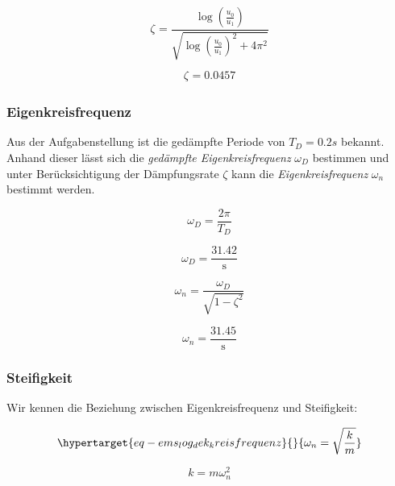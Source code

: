 \documentclass[
  letterpaper,
  DIV=11]{scrreprt}
\begin{document}
\begin{equation}\zeta_{} = \frac{\log{\left(\frac{u_{0}}{u_{1}} \right)}}{\sqrt{\log{\left(\frac{u_{0}}{u_{1}} \right)}^{2} + 4 \pi^{2}}}\end{equation}

\begin{equation}\zeta_{} = 0.0457\end{equation}

\hypertarget{eigenkreisfrequenz}{%
\subsubsection{Eigenkreisfrequenz}\label{eigenkreisfrequenz}}

Aus der Aufgabenstellung ist die gedämpfte Periode von \(T_D = 0.2 s\)
bekannt. Anhand dieser lässt sich die \emph{gedämpfte
Eigenkreisfrequenz} \(\omega_D\) bestimmen und unter Berücksichtigung
der Dämpfungsrate \(\zeta\) kann die \emph{Eigenkreisfrequenz}
\(\omega_n\) bestimmt werden.

\begin{equation}\omega_{D} = \frac{2 \pi}{T_{D}}\end{equation}

\begin{equation}\omega_{D} = \frac{31.42}{\text{s}}\end{equation}

\begin{equation}\omega_{n} = \frac{\omega_{D}}{\sqrt{1 - \zeta_{}^{2}}}\end{equation}

\begin{equation}\omega_{n} = \frac{31.45}{\text{s}}\end{equation}

\hypertarget{steifigkeit}{%
\subsubsection{Steifigkeit}\label{steifigkeit}}

Wir kennen die Beziehung zwischen Eigenkreisfrequenz und Steifigkeit:

\begin{equation}\protect\hypertarget{eq-ems_log_dek_kreisfrequenz}{}{
\omega_n = \sqrt{\frac{k}{m}}
}\label{eq-ems_log_dek_kreisfrequenz}\end{equation}

\begin{equation}k = m \omega_{n}^{2}\end{equation}
\end{document}
